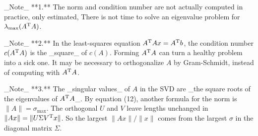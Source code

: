 _Note_ **1.** The norm and condition number are not actually computed in practice, only estimated, There is not time to solve an eigenvalue problem for \(\lambda_{\max}(A^{\rm T}A)\).

_Note_ **2.** In the least-squares equation \(A^{\rm T}Ax=A^{\rm T}b\), the condition number \(c(A^{\rm T}A)\) is the _square_ of \(c(A)\). Forming \(A^{\rm T}A\) can turn a healthy problem into a sick one. It may be necessary to orthogonalize \(A\) by Gram-Schmidt, instead of computing with \(A^{\rm T}A\).

_Note_ **3.** The _singular values_ of \(A\) in the SVD are _the square roots of the eigenvalues of \(A^{\rm T}A\)_. By equation (12), another formula for the norm is \(\|A\|=\sigma_{\max}\). The orthogonal \(U\) and \(V\) leave lengths unchanged in \(\|Ax\|=\|U\Sigma V^{\rm T}x\|\). So the largest \(\|Ax\|/\|x\|\) comes from the largest \(\sigma\) in the diagonal matrix \(\Sigma\).

 